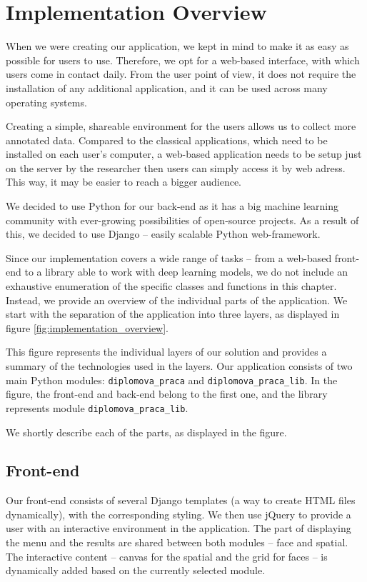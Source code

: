\chapter{Implementation Overview}
\label{ch:developers_guide}
\label{ch:programmers_guide}

When we were creating our application, we kept in mind to make it as easy as possible for users to use. Therefore, we opt for a web-based interface, with which users come in contact daily. From the user point of view, it does not require the installation of any additional application, and it can be used across many operating systems.

Creating a simple, shareable environment for the users allows us to collect more annotated data. Compared to the classical applications, which need to be installed on each user's computer, a web-based application needs to be setup just on the server by the researcher then users can simply access it by web adress. This way, it may be easier to reach a bigger audience.

We decided to use Python for our back-end as it has a big machine learning community with ever-growing possibilities of open-source projects. As a result of this, we decided to use Django -- easily scalable Python web-framework.

Since our implementation covers a wide range of tasks -- from a web-based front-end to a library able to work with deep learning models, we do not include an exhaustive enumeration of the specific classes and functions in this chapter. Instead, we provide an overview of the individual parts of the application. We start with the separation of the application into three layers, as displayed in figure \ref{fig:implementation_overview}.

This figure represents the individual layers of our solution and provides a summary of the technologies used in the layers. Our application consists of two main Python modules: \verb+diplomova_praca+ and \verb+diplomova_praca_lib+. In the figure, the front-end and back-end belong to the first one, and the library represents module \verb+diplomova_praca_lib+.

We shortly describe each of the parts, as displayed in the figure.

\section{Front-end}

Our front-end consists of several Django templates (a way to create HTML files dynamically), with the corresponding styling. We then use jQuery to provide a user with an interactive environment in the application.  The part of displaying the menu and the results are shared between both modules -- face and spatial. The interactive content -- canvas for the spatial and the grid for faces -- is dynamically added based on the currently selected module.

